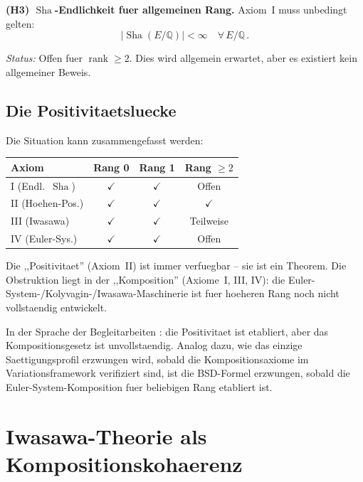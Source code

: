 \documentclass[aps,prd,twocolumn,superscriptaddress,nofootinbib]{revtex4-2}
\theoremstyle{definition}
\theoremstyle{remark}
\DeclareMathOperator{\rank}{rank}
\DeclareMathOperator{\Sha}{Sha}
\begin{document}
\textbf{(H3) $\Sha$-Endlichkeit fuer allgemeinen Rang.} Axiom~I muss unbedingt gelten:
\begin{equation}
|\Sha(E/\mathbb{Q})| < \infty \quad \forall\, E/\mathbb{Q}\,.
\end{equation}

\textit{Status:} Offen fuer $\rank \geq 2$. Dies wird allgemein erwartet, aber es existiert kein allgemeiner Beweis.

\subsection{Die Positivitaetsluecke}

Die Situation kann zusammengefasst werden:

\begin{center}
\begin{tabular}{lccc}
\toprule
Axiom & Rang 0 & Rang 1 & Rang $\geq 2$ \\
\midrule
I (Endl.\ $\Sha$) & $\checkmark$ & $\checkmark$ & Offen \\
II (Hoehen-Pos.) & $\checkmark$ & $\checkmark$ & $\checkmark$ \\
III (Iwasawa) & $\checkmark$ & $\checkmark$ & Teilweise \\
IV (Euler-Sys.) & $\checkmark$ & $\checkmark$ & Offen \\
\bottomrule
\end{tabular}
\end{center}

Die ,,Positivitaet'' (Axiom~II) ist immer verfuegbar -- sie ist ein Theorem. Die Obstruktion liegt in der ,,Komposition'' (Axiome~I, III, IV): die Euler-System-/Kolyvagin-/Iwasawa-Maschinerie ist fuer hoeheren Rang noch nicht vollstaendig entwickelt.

In der Sprache der Begleitarbeiten \cite{Geiger2026e,FST-Unified2026}: die Positivitaet ist etabliert, aber das Kompositionsgesetz ist unvollstaendig. Analog dazu, wie das einzige Saettigungsprofil erzwungen wird, sobald die Kompositionsaxiome im Variationsframework verifiziert sind, ist die BSD-Formel erzwungen, sobald die Euler-System-Komposition fuer beliebigen Rang etabliert ist.


\section{Iwasawa-Theorie als Kompositionskohaerenz}
\label{sec:iwasawa}
\end{document}
